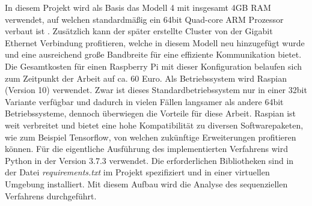 In diesem Projekt wird als Basis das Modell 4 mit insgesamt 4GB \ac{RAM} verwendet, auf welchen standardmäßig ein 64bit Quad-core ARM Prozessor verbaut ist \cite{raspberryspecs}. Zusätzlich kann der später erstellte Cluster von der Gigabit Ethernet Verbindung profitieren, welche in diesem Modell neu hinzugefügt wurde und eine ausreichend große Bandbreite für eine effiziente Kommunikation bietet. Die Gesamtkosten für einen Raspberry Pi mit dieser Konfiguration belaufen sich zum Zeitpunkt der Arbeit auf ca. 60 Euro. Als Betriebssystem wird Raspian (Version 10) verwendet. Zwar ist dieses Standardbetriebssystem nur in einer 32bit Variante verfügbar und dadurch in vielen Fällen langsamer als andere 64bit Betriebssysteme, dennoch überwiegen die Vorteile für diese Arbeit. Raspian ist weit verbreitet und bietet eine hohe Kompatibilität zu diversen Softwarepaketen, wie zum Beispiel Tensorflow, von welchen zukünftige Erweiterungen profitieren können. Für die eigentliche Ausführung des implementierten Verfahrens wird Python in der Version 3.7.3 verwendet. Die erforderlichen Bibliotheken sind in der Datei \emph{requirements.txt} im Projekt spezifiziert und in einer virtuellen Umgebung installiert. Mit diesem Aufbau wird die Analyse des sequenziellen Verfahrens durchgeführt.
